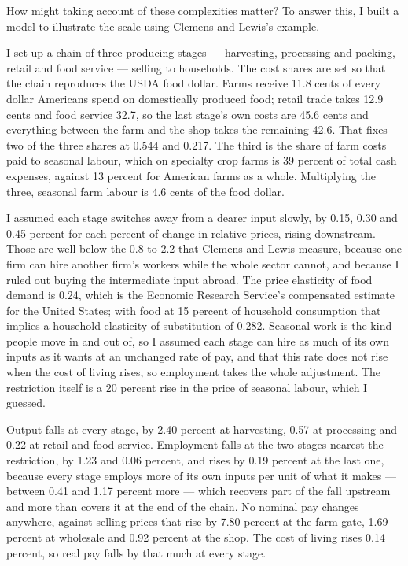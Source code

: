 \documentclass[11pt,a4paper]{article}
\begin{document}
How might taking account of these complexities matter? To answer this, I built a model to illustrate the scale using Clemens and Lewis's example.

I set up a chain of three producing stages — harvesting, processing and packing, retail and food service — selling to households. The cost shares are set so that the chain reproduces the USDA food dollar. Farms receive 11.8 cents of every dollar Americans spend on domestically produced food; retail trade takes 12.9 cents and food service 32.7, so the last stage's own costs are 45.6 cents and everything between the farm and the shop takes the remaining 42.6. That fixes two of the three shares at 0.544 and 0.217. The third is the share of farm costs paid to seasonal labour, which on specialty crop farms is 39 percent of total cash expenses, against 13 percent for American farms as a whole. Multiplying the three, seasonal farm labour is 4.6 cents of the food dollar.

I assumed each stage switches away from a dearer input slowly, by 0.15, 0.30 and 0.45 percent for each percent of change in relative prices, rising downstream. Those are well below the 0.8 to 2.2 that Clemens and Lewis measure, because one firm can hire another firm's workers while the whole sector cannot, and because I ruled out buying the intermediate input abroad. The price elasticity of food demand is 0.24, which is the Economic Research Service's compensated estimate for the United States; with food at 15 percent of household consumption that implies a household elasticity of substitution of 0.282. Seasonal work is the kind people move in and out of, so I assumed each stage can hire as much of its own inputs as it wants at an unchanged rate of pay, and that this rate does not rise when the cost of living rises, so employment takes the whole adjustment. The restriction itself is a 20 percent rise in the price of seasonal labour, which I guessed.

Output falls at every stage, by 2.40 percent at harvesting, 0.57 at processing and 0.22 at retail and food service. Employment falls at the two stages nearest the restriction, by 1.23 and 0.06 percent, and rises by 0.19 percent at the last one, because every stage employs more of its own inputs per unit of what it makes — between 0.41 and 1.17 percent more — which recovers part of the fall upstream and more than covers it at the end of the chain. No nominal pay changes anywhere, against selling prices that rise by 7.80 percent at the farm gate, 1.69 percent at wholesale and 0.92 percent at the shop. The cost of living rises 0.14 percent, so real pay falls by that much at every stage.
\end{document}
